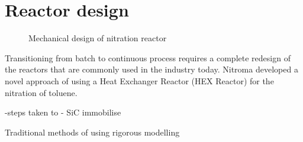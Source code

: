 \section*{Reactor design}
\begin{figure}[h]
    \centering
    \caption{Mechanical design of nitration reactor}
    \label{fig:comsol-S4-CW-X-T}
\end{figure}

Transitioning from batch to continuous process requires a complete redesign of the reactors that are commonly used in the industry today. Nitroma developed a novel approach of using a Heat Exchanger Reactor (HEX Reactor) for the nitration of toluene.

-steps taken to
- SiC immobilise


Traditional methods of using 
rigorous modelling


